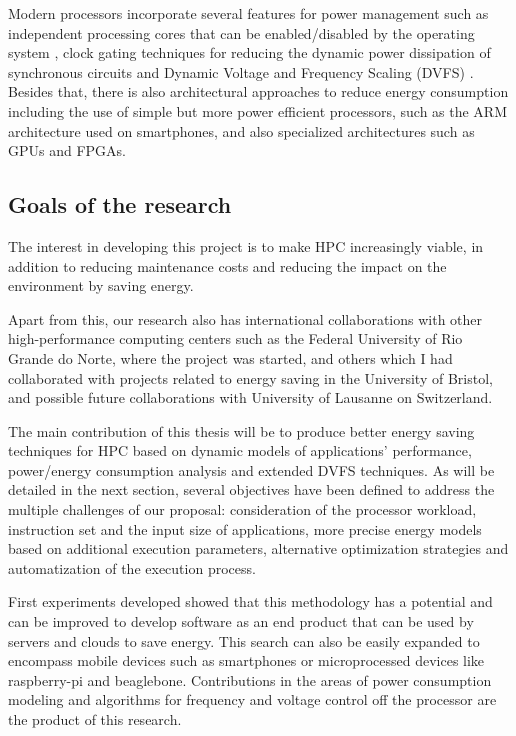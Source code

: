 Modern processors incorporate several features for power management such as independent processing cores that can be enabled/disabled by the operating system \cite{Rotem2012}, clock gating techniques for reducing the dynamic power dissipation of synchronous circuits \cite{Srinivasan2015} and Dynamic Voltage and Frequency Scaling (DVFS) \cite{Mittal2014}. Besides that, there is also architectural approaches to reduce energy consumption including the use of simple but more power efficient processors, such as the ARM architecture used on smartphones, and also specialized architectures such as GPUs and FPGAs.


\subsection{Goals of the research}

The interest in developing this project is to make HPC increasingly viable, in addition to reducing maintenance costs and reducing the impact on the environment by saving energy.

Apart from this, our research also has international collaborations with other high-performance computing centers such as the Federal University of Rio Grande do Norte, where the project was started, and others which I had collaborated with projects related to energy saving in the University of Bristol, and possible future collaborations with University of Lausanne on Switzerland.

The main contribution of this thesis will be to produce better energy saving techniques for HPC based on dynamic models of applications’ performance, power/energy consumption analysis and extended DVFS techniques. As will be detailed in the next section, several objectives have been defined to address the multiple challenges of our proposal: consideration of the processor workload, instruction set and the input size of applications, more precise energy models based on additional execution parameters, alternative optimization strategies and automatization of the execution process.

First experiments developed showed that this methodology has a potential and can be improved to develop software as an end product that can be used by servers and clouds to save energy. This search can also be easily expanded to encompass mobile devices such as smartphones or microprocessed devices like raspberry-pi and beaglebone. Contributions in the areas of power consumption modeling and algorithms for frequency and voltage control off the processor are the product of this research.


